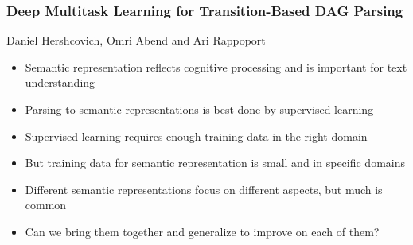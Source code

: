 \documentclass[t,xcolor={svgnames}]{beamer}
\begin{document}
\begin{frame}
\frametitle{Deep Multitask Learning for Transition-Based DAG Parsing}
\vspace{-5mm}
\begin{center}
    Daniel Hershcovich, Omri Abend and Ari Rappoport
\end{center}
\begin{itemize}
\item Semantic representation reflects cognitive processing and is important for text understanding
\item Parsing to semantic representations is best done by supervised learning
\item Supervised learning requires enough training data in the right domain
\item But training data for semantic representation is small and in specific domains
\item Different semantic representations focus on different aspects, but much is common
\item Can we bring them together and generalize to improve on each of them?
\end{itemize}
\end{frame}
\end{document}
